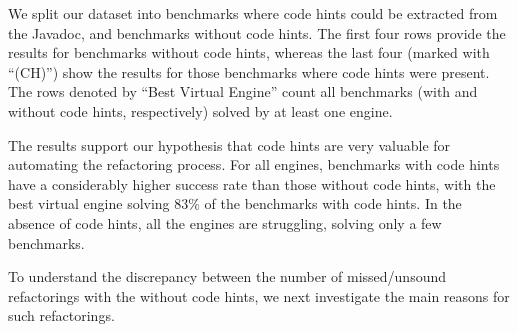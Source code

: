 \documentclass[sigconf,review,anonymous]{acmart}
\begin{document}
We split our dataset into benchmarks where code hints could be extracted from the Javadoc, and benchmarks without code hints.
The first four rows provide the results for benchmarks without code hints, whereas the last four (marked with ``(CH)'') show the results for those
benchmarks where code hints were present. The rows denoted by ``Best Virtual Engine'' count all benchmarks (with and without code hints, respectively)
solved by at least one engine.

The results support our hypothesis that code hints are very valuable for automating the refactoring process.
For all engines, benchmarks with code hints have a considerably higher success rate than those without code hints, with the best virtual
engine solving 83\% of the benchmarks with code hints. In the absence of code hints, all the engines are struggling, solving only a few benchmarks.

To understand the discrepancy between the number of missed/unsound refactorings with the without code hints,
we next investigate the main reasons for such refactorings.




%
%
\end{document}
